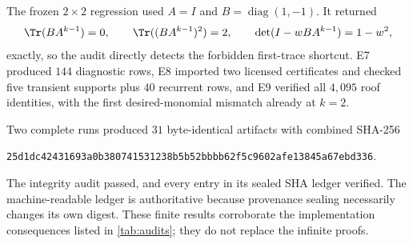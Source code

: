 The frozen $2\times2$ regression used
$A=I$ and $B=\operatorname{diag}(1,-1)$.  It returned
\[
 \Tr(BA^{k-1})=0,
 \qquad
 \Tr((BA^{k-1})^2)=2,
 \qquad
 \det(I-wBA^{k-1})=1-w^2,
\]
exactly, so the audit directly detects the forbidden first-trace shortcut.
E7 produced $144$ diagnostic rows, E8 imported two licensed certificates
and checked five transient supports plus $40$ recurrent rows, and E9
verified all $4{,}095$ roof identities, with the first desired-monomial
mismatch already at $k=2$.

Two complete runs produced $31$ byte-identical artifacts with combined
SHA-256
\begin{center}\small
\texttt{25d1dc42431693a0b380741531238b5b52bbbb62f5c9602afe13845a67ebd336}.
\end{center}
The integrity audit passed, and every entry in its sealed SHA ledger
verified.  The machine-readable ledger is authoritative because provenance
sealing necessarily changes its own digest.
These finite results corroborate the implementation consequences listed in
\cref{tab:audits}; they do not replace the infinite proofs.

